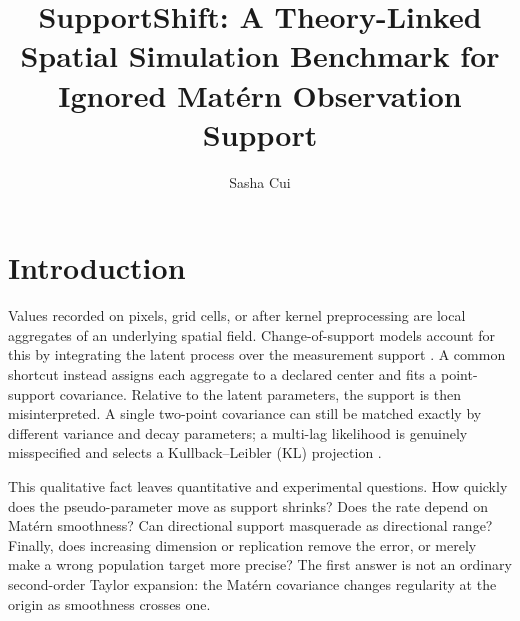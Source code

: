 \documentclass[sigconf]{acmart}
\title{SupportShift: A Theory-Linked Spatial Simulation Benchmark
for Ignored Matérn Observation Support}
\author{Sasha Cui}
\affiliation{%
  \institution{Independent researcher}
  \city{New Haven}
  \state{Connecticut}
  \country{United States}}
\theoremstyle{remark}
\begin{document}
\maketitle

\section{Introduction}

Values recorded on pixels, grid cells, or after kernel preprocessing are local
aggregates of an underlying spatial field. Change-of-support models account for
this by integrating the latent process over the measurement support
\cite{gelfand2001support,chacon2024change,tanaka2019aggregated,zheng2026fusion}.
A common shortcut instead assigns each aggregate to a declared center and fits a
point-support covariance. Relative to the latent parameters, the support is then
misinterpreted. A single two-point covariance can still be matched exactly by
different variance and decay parameters; a multi-lag likelihood is genuinely
misspecified and selects a Kullback--Leibler (KL) projection
\cite{bachoc2018misspecified}.

This qualitative fact leaves quantitative and experimental questions. How
quickly does the pseudo-parameter move as support shrinks? Does the rate depend
on Matérn smoothness? Can directional support masquerade as directional range?
Finally, does increasing dimension or replication remove the error, or merely
make a wrong population target more precise? The first answer is not an ordinary
second-order Taylor expansion: the Matérn covariance changes regularity at the
origin as smoothness crosses one.
\end{document}

